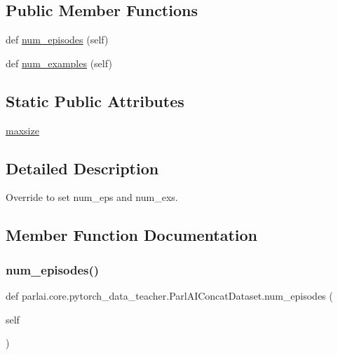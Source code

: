 \subsection*{Public Member Functions}
\begin{DoxyCompactItemize}
\item 
def \hyperlink{classparlai_1_1core_1_1pytorch__data__teacher_1_1ParlAIConcatDataset_a17a0c832fe97e4ab80906ba691d85ba3}{num\+\_\+episodes} (self)
\item 
def \hyperlink{classparlai_1_1core_1_1pytorch__data__teacher_1_1ParlAIConcatDataset_a18b104ac4b013780a973cf8655b8406a}{num\+\_\+examples} (self)
\end{DoxyCompactItemize}
\subsection*{Static Public Attributes}
\begin{DoxyCompactItemize}
\item 
\hyperlink{classparlai_1_1core_1_1pytorch__data__teacher_1_1ParlAIConcatDataset_a431fa0b54c4f0d63911c8bcaf73b8ffc}{maxsize}
\end{DoxyCompactItemize}


\subsection{Detailed Description}
\begin{DoxyVerb}Override to set num_eps and num_exs.
\end{DoxyVerb}
 

\subsection{Member Function Documentation}
\mbox{\label{classparlai_1_1core_1_1pytorch__data__teacher_1_1ParlAIConcatDataset_a17a0c832fe97e4ab80906ba691d85ba3}} 
\subsubsection{\texorpdfstring{num\+\_\+episodes()}{num\_episodes()}}
{\footnotesize\ttfamily def parlai.\+core.\+pytorch\+\_\+data\+\_\+teacher.\+Parl\+A\+I\+Concat\+Dataset.\+num\+\_\+episodes (\begin{DoxyParamCaption}\item[{}]{self }\end{DoxyParamCaption})}

